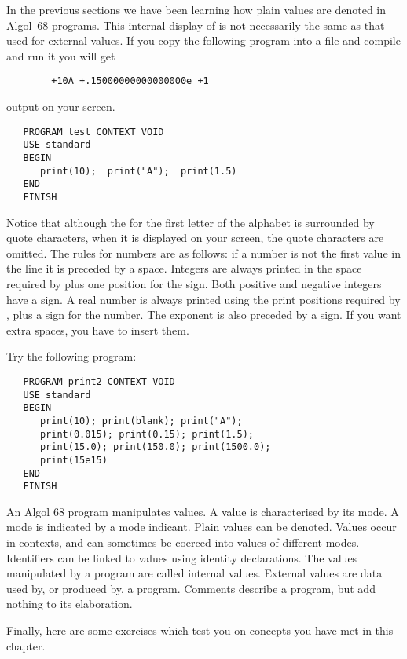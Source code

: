 In the previous sections we have been learning how plain values are
denoted in Algol~68 programs. This internal display of
is not necessarily the same as that used for external values. If
you copy the following program into a file and compile and run it
you will get\par
\verb*|        +10A +.15000000000000000e +1|\par\noindent
output on your screen.
\begin{verbatim}
   PROGRAM test CONTEXT VOID
   USE standard
   BEGIN
      print(10);  print("A");  print(1.5)
   END
   FINISH
\end{verbatim}
\noindent
Notice that although the  for the first letter of the
alphabet is surrounded by quote characters, when it is displayed on
your screen, the quote characters are omitted.  The rules for numbers
are as follows: if a number is not the first value in the line it is
preceded by a space.  Integers are always printed in the space
required by  plus one position for the sign. Both
positive and negative integers have a sign.  A real number is always
printed using the print positions required by , plus a
sign for the number. The exponent is also preceded by a sign.  If you
want extra spaces, you have to insert them.

Try the following program:
\begin{verbatim}
   PROGRAM print2 CONTEXT VOID
   USE standard
   BEGIN
      print(10); print(blank); print("A");
      print(0.015); print(0.15); print(1.5);
      print(15.0); print(150.0); print(1500.0);
      print(15e15)
   END
   FINISH
\end{verbatim}

An Algol 68 program manipulates values. A value is characterised by
its mode. A mode is indicated by a mode indicant. Plain values can be
denoted. Values occur in contexts, and can sometimes be coerced into
values of different modes. Identifiers can be linked to values using
identity declarations.  The values manipulated by a program are
called internal values.  External values are data used by, or
produced by, a program. Comments describe a program, but add nothing
to its elaboration.

Finally, here are some exercises which test you on concepts you have
met in this chapter.
\newpage

